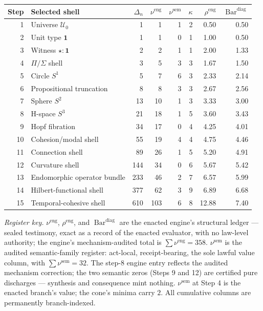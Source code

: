 \documentclass[11pt]{article}
\theoremstyle{plain}
\theoremstyle{definition}
\theoremstyle{remark}
\newcommand{\U}{\mathcal{U}}
\newcommand{\SelBar}{\operatorname{Bar}}
\begin{document}
\begin{center}
\small
\begin{tabular}{r l r r r r r r}
\toprule
Step & Selected shell & \(\Delta_n\) & \(\nu^{\mathrm{eng}}\) & \(\nu^{\mathrm{sem}}\) & \(\kappa\) & \(\rho^{\mathrm{eng}}\) & \(\SelBar^{\mathrm{diag}}\) \\
\midrule
1  & Universe \(\U_0\) & 1   & 1   & 1 & 2 & 0.50  & 0.50 \\
2  & Unit type \(\mathbf{1}\) & 1   & 1   & 0 & 1 & 1.00  & 0.50 \\
3  & Witness \(\star:\mathbf{1}\) & 2   & 2   & 1 & 1 & 2.00  & 1.33 \\
4  & \(\Pi/\Sigma\) shell & 3   & 5   & 3 & 3 & 1.67  & 1.50 \\
5  & Circle \(S^1\) & 5   & 7   & 6 & 3 & 2.33  & 2.14 \\
6  & Propositional truncation & 8   & 8   & 3 & 3 & 2.67  & 2.56 \\
7  & Sphere \(S^2\) & 13  & 10  & 1 & 3 & 3.33  & 3.00 \\
8  & H-space \(S^3\) & 21  & 18  & 1 & 5 & 3.60  & 3.43 \\
9  & Hopf fibration & 34  & 17  & 0 & 4 & 4.25  & 4.01 \\
10 & Cohesion/modal shell & 55  & 19  & 4 & 4 & 4.75  & 4.46 \\
11 & Connection shell & 89  & 26  & 1 & 5 & 5.20  & 4.91 \\
12 & Curvature shell & 144 & 34  & 0 & 6 & 5.67  & 5.42 \\
13 & Endomorphic operator bundle & 233 & 46  & 2 & 7 & 6.57  & 5.99 \\
14 & Hilbert-functional shell & 377 & 62  & 3 & 9 & 6.89  & 6.68 \\
15 & Temporal-cohesive shell & 610 & 103 & 6 & 8 & 12.88 & 7.40 \\
\bottomrule
\end{tabular}
\end{center}

\noindent\emph{Register key.} \(\nu^{\mathrm{eng}}\), \(\rho^{\mathrm{eng}}\), and \(\SelBar^{\mathrm{diag}}\) are the enacted engine's structural ledger --- sealed testimony, exact as a record of the enacted evaluator, with no law-level authority; the engine's mechanism-audited total is \(\sum\nu^{\mathrm{eng}}=358\). \(\nu^{\mathrm{sem}}\) is the audited semantic-family register: act-local, receipt-bearing, the sole lawful value column, with \(\sum\nu^{\mathrm{sem}}=32\). The step-8 engine entry reflects the audited mechanism correction; the two semantic zeros (Steps 9 and 12) are certified pure discharges --- synthesis and consequence mint nothing. \(\nu^{\mathrm{sem}}\) at Step 4 is the enacted branch's value; the cone's minima carry \(2\). All cumulative columns are permanently branch-indexed.
\end{document}
